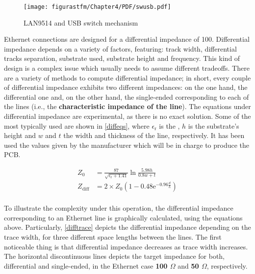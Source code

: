\begin{figure} [H]
			\centering
			\texttt{[image: figurastfm/Chapter4/PDF/swusb.pdf]}
			\caption{LAN9514 and \acrshort{USB} switch mechanism} \label{swusb}
\end{figure}
Ethernet connections are designed for a differential impedance of \SI{100}{\text{ \ohm}}. Differential impedance depends on a variety of factors, featuring: track width, differential tracks separation, substrate used, substrate height and frequency. This kind of design is a complex issue which usually needs to assume different tradeoffs. There are a variety of methods to compute differential impedance; in short, every couple of differential impedance exhibits two different impedances: on the one hand, the differential one and, on the other hand, the single-ended corresponding to each of the lines (i.e., the \textbf{characteristic impedance of the line}). The equations under differential impedance are experimental, as there is no exact solution. Some of the most typically used are shown in \autoref{diffeqs}, where $\epsilon_\text{r}$ is the , $h$ is the substrate's height and $w$ and $t$ the width and thickness of the line, respectively. It has been used the values given by the manufacturer which will be in charge to produce the \acrshort{PCB}.

\begin{equation}
\begin{split}
Z_{\text{0}} &= \frac{87}{\sqrt{\epsilon_{\text{r}}+1.41}} \ln \frac{5.98h}{0.8w+t} \\
Z_{\text{diff}} &= 2\times Z_{\text{0}} (1-0.48\mathrm{e}^{-0.96\frac{d}{h}})\\
\end{split}\label{diffeqs}
\end{equation}


To illustrate the complexity under this operation, the differential impedance corresponding to an Ethernet line is graphically calculated, using the equations above. Particularly, \autoref{difftrace} depicts the differential impedance depending on the trace width, for three different space lengths between the lines. The first noticeable thing is that differential impedance decreases as trace width increases. The horizontal discontinuous lines depicts the target impedance for both, differential and single-ended, in the Ethernet case \textbf{100 $\Omega$} and \textbf{50 $\Omega$}, respectively. 
 

